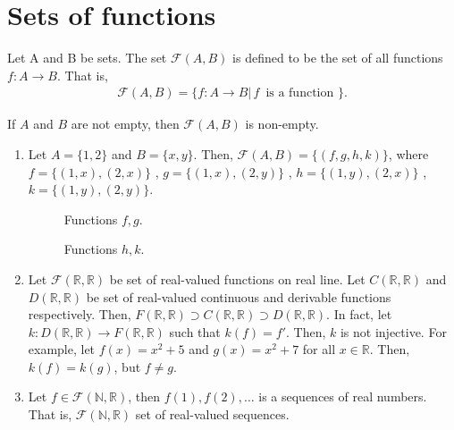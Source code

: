 \documentclass[a4paper,english,12pt]{article}   	%
\begin{document}
\section{Sets of functions}
\begin{defn} Let A and B be sets. The set $\mathcal{F}(A,B)$ is defined to be the set of all functions $f \colon A \to B$. That is,
\begin{align*}
\mathcal{F}(A,B) = \{f \colon A \to B |\, f \,\text{ is a function }\}.
\end{align*}
\end{defn}
\begin{rem} If $A$ and $B$ are not empty, then $\mathcal{F}(A,B)$ is non-empty.
\end{rem}
\begin{exmp} 
\begin{enumerate}
\item Let $A=\{1,2\}$ and $B=\{x,y\}$. Then, $\mathcal{F}(A,B) = \{ (f,g,h,k)\}$, where $f=\{(1,x),(2,x)\}$ , $g=\{(1,x),(2,y)\}$ , $h=\{(1,y),(2,x)\}$ , $k=\{(1,y),(2,y)\}$.
\begin{figure}[hhhh]
\centering
\scalebox{.8}{ }
\caption{Functions $f,g$.}
\label{Fig:fg}
\end{figure}
\begin{figure}[hhhh]
\centering
\scalebox{.8}{ }
\caption{Functions $h,k$.}
\label{Fig:hk}
\end{figure}
\item Let $\mathcal{F}(\mathbb{R}, \mathbb{R})$ be set of real-valued functions on real line. Let $C(\mathbb{R}, \mathbb{R})$ and $D(\mathbb{R}, \mathbb{R})$ be set of real-valued continuous and derivable functions respectively. Then, $F(\mathbb{R},\mathbb{R}) \supset C(\mathbb{R},\mathbb{R}) \supset D(\mathbb{R},\mathbb{R})$. In fact, let $k \colon D(\mathbb{R},\mathbb{R}) \to F(\mathbb{R},\mathbb{R})$ such that $k(f)=f'$. Then, $k$ is not injective. For example, let $f(x) = x^2 + 5$ and $g(x) = x^2 + 7$ for all $x \in \mathbb{R}$. Then, $k(f) = k(g)$, but $f \neq g$.
\item Let $f \in \mathcal{F}(\mathbb{N},\mathbb{R})$, then $f(1),f(2),\ldots$ is a sequences of real numbers. That is, $\mathcal{F}(\mathbb{N},\mathbb{R})$ set of real-valued sequences.
\end{enumerate}
\end{exmp}
\end{document}
